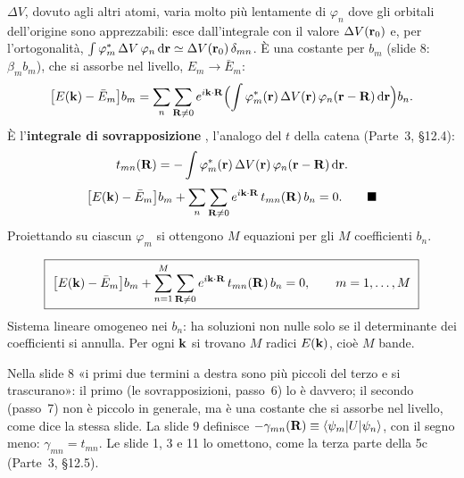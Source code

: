 \documentclass[11pt,a4paper]{article}
\begin{document}
\begin{dimostrazione}
$\Delta V$, dovuto agli altri atomi, varia molto più lentamente di $\varphi_n$ dove gli orbitali dell'origine sono apprezzabili: esce dall'integrale con
il valore $\Delta V(\mathbf r_0)$ e, per l'ortogonalità, $\int\varphi_m^*\,\Delta V\,\varphi_n\,\mathrm d\mathbf r\simeq\Delta V(\mathbf r_0)\,\delta_{mn}$. È una costante per
$b_m$ (slide 8: $\beta_mb_m$), che si assorbe nel livello, $E_m\to\bar E_m$:
\[
\bigl[E(\mathbf k)-\bar E_m\bigr]b_m=\sum_n\sum_{\mathbf R\ne0}e^{i\mathbf k\cdot\mathbf R}\Bigl(\int\varphi_m^*(\mathbf r)\,\Delta V(\mathbf r)\,\varphi_n(\mathbf r-\mathbf R)\,\mathrm d\mathbf r\Bigr)b_n .
\]
È l'\textbf{integrale di sovrapposizione} , l'analogo del $t$ della catena (Parte~3, §12.4):
\[
t_{mn}(\mathbf R)=-\int\varphi_m^*(\mathbf r)\,\Delta V(\mathbf r)\,\varphi_n(\mathbf r-\mathbf R)\,\mathrm d\mathbf r .
\]
\[
\bigl[E(\vk)-\bar E_m\bigr]b_m+\sum_n\sum_{\vR\ne0}e^{i\vk\cdot\vR}\,t_{mn}(\vR)\,b_n=0 .\qed
\]
Proiettando su ciascun $\varphi_m$ si ottengono $M$ equazioni per gli $M$ coefficienti $b_n$.
\end{dimostrazione}

\begin{chiave}
\[
\boxed{\ \bigl[E(\mathbf k)-\bar E_m\bigr]b_m+\sum_{n=1}^M\sum_{\mathbf R\ne0}e^{i\mathbf k\cdot\mathbf R}\,t_{mn}(\mathbf R)\,b_n=0,\qquad m=1,\dots,M\ }
\]
Sistema lineare omogeneo nei $b_n$: ha soluzioni non nulle solo se il determinante dei coefficienti si annulla. Per ogni $\mathbf k$ si trovano $M$ radici
$E(\mathbf k)$, cioè $M$ bande.
\end{chiave}

\begin{osservazione}[le slide 1, 8 e 9]
Nella slide 8 «i primi due termini a destra sono più piccoli del terzo e si trascurano»: il primo (le sovrapposizioni, passo~6) lo è davvero; il
secondo (passo~7) non è piccolo in generale, ma è una costante che si assorbe nel livello, come dice la stessa slide. La slide 9 definisce
$-\gamma_{mn}(\mathbf R)\equiv\langle\psi_m|U|\psi_n\rangle$, con il segno meno: $\gamma_{mn}=t_{mn}$. Le slide 1, 3 e 11 lo omettono, come la terza parte
della 5c (Parte~3, §12.5).
\end{osservazione}
\end{document}
